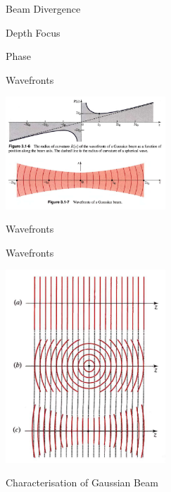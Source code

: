 \documentclass[11pt]{beamer}
\begin{document}
	\begin{frame}{Beam Divergence}
		
	\end{frame}
	
	\begin{frame}{Depth Focus}
		
	\end{frame}
	
	\begin{frame}{Phase}
		
	\end{frame}
	
	\begin{frame}{Wavefronts}
		\begin{center}
			\includegraphics[width=6cm]{gaussian6.png}
		\end{center}
	\end{frame}
	
		\begin{frame}{Wavefronts}

	\end{frame}
	
	
	\begin{frame}{Wavefronts}
	\begin{center}
	\includegraphics[width=6cm]{gaussian7.png}
\end{center}
	\end{frame}
	
	\begin{frame}{Characterisation of Gaussian Beam}
		
	\end{frame}
	
\end{document}
